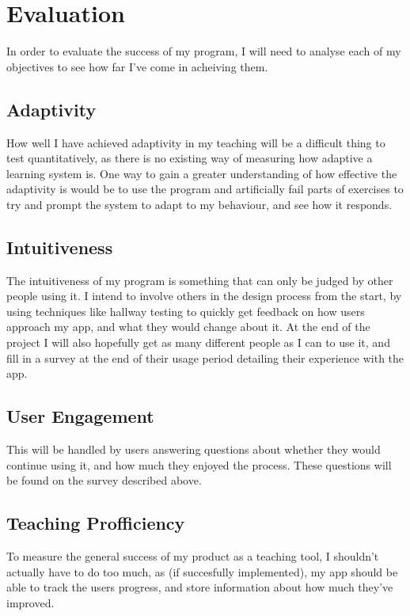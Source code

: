 \chapter{Evaluation}

In order to evaluate the success of my program, I will need to analyse each of my objectives to see how far I've come in acheiving them.

\section{Adaptivity}
How well I have achieved adaptivity in my teaching will be a difficult thing to test quantitatively, as there is no existing way of measuring how adaptive a learning system is. One way to gain a greater understanding of how effective the adaptivity is would be to use the program and artificially fail parts of exercises to try and prompt the system to adapt to my behaviour, and see how it responds.

\section{Intuitiveness}
The intuitiveness of my program is something that can only be judged by other people using it. I intend to involve others in the design process from the start, by using techniques like hallway testing to quickly get feedback on how users approach my app, and what they would change about it. At the end of the project I will also hopefully get as many different people as I can to use it, and fill in a survey at the end of their usage period detailing their experience with the app.
\section{User Engagement}
This will be handled by users answering questions about whether they would continue using it, and how much they enjoyed the process. These questions will be found on the survey described above.

\section{Teaching Profficiency}
To measure the general success of my product as a teaching tool, I shouldn't actually have to do too much, as (if succesfully implemented), my app should be able to track the users progress, and store information about how much they've improved.

